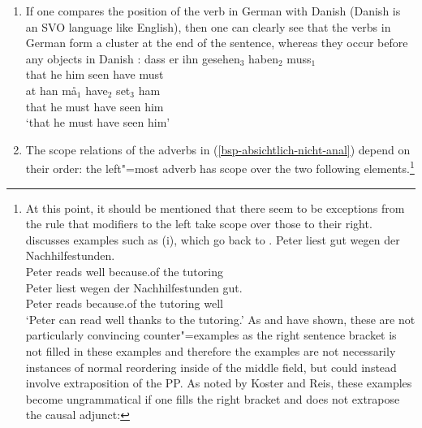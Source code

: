 \begin{enumerate}
\item If one compares the position of the verb in German with Danish (Danish is an SVO language
like English), then one can clearly see that the verbs in German form a cluster at the end of the sentence,
whereas they occur before any objects in Danish \citep[]{Oersnes2009b}:
\eal
\ex 
\gll dass er ihn gesehen$_3$ haben$_2$ muss$_1$\\
	 that he him seen have must\\
\ex 
\gll at han må$_1$ have$_2$ set$_3$ ham\\
     that he must have seen him\\
\glt `that he must have seen him'
\zl
\item\label{SOV-Skopus} The scope relations of the adverbs in
  (\ref{bsp-absichtlich-nicht-anal}) depend on their order:
the left"=most adverb has scope over the two following elements.\footnote{%
At this point, it should be mentioned that there seem to be exceptions from the rule that modifiers to the left take scope over those to
their right. \citet*[]{Kasper94a} discusses examples such as (i), which go back to \citet*[]{BV72}.
%
\setlength{\footexindent}{1.5em}
\eal
\label{bsp-peter-liest-gut-wegen}
\ex 
\gll Peter liest gut wegen der Nachhilfestunden.\\
	 Peter reads well because.of the tutoring\\
\ex 
\gll Peter liest wegen der Nachhilfestunden gut.\\
	 Peter reads because.of the tutoring well\\
\glt `Peter can read well thanks to the tutoring.'
\zl
	As \citet[Section~6]{Koster75a} and \citet*[]{Reis80a} have shown, these are not particularly convincing counter"=examples
	as the right sentence bracket is not filled in these examples and therefore the examples are
        not necessarily instances of normal reordering inside of the middle field, but could instead
        involve extraposition of the PP.
	As noted by Koster and Reis, these examples become ungrammatical if one fills the right bracket and does not extrapose the causal adjunct:
\eal
{}
}
\end{enumerate}
